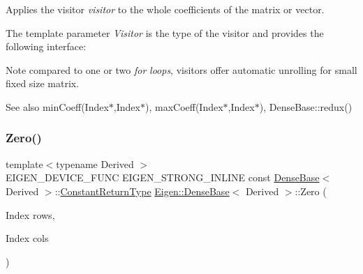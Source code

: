 Applies the visitor {\itshape visitor} to the whole coefficients of the matrix or vector.

The template parameter {\itshape Visitor} is the type of the visitor and provides the following interface\+: 
\begin{DoxyCode}{0}
\DoxyCodeLine{  \textcolor{comment}{// called for the first coefficient}}
\DoxyCodeLine{  \textcolor{comment}{// called for all other coefficients}}
\DoxyCodeLine{\};}
\end{DoxyCode}


\begin{DoxyNote}{Note}
compared to one or two {\itshape for} {\itshape loops}, visitors offer automatic unrolling for small fixed size matrix.
\end{DoxyNote}
\begin{DoxySeeAlso}{See also}
min\+Coeff(\+Index$\ast$,\+Index$\ast$), max\+Coeff(\+Index$\ast$,\+Index$\ast$), Dense\+Base\+::redux() 
\end{DoxySeeAlso}
\mbox{\label{class_eigen_1_1_dense_base_a3832aa9b2ee9ebdb4458003c742c9027}} 
\subsubsection{\texorpdfstring{Zero()}{Zero()}\hspace{0.1cm}{\footnotesize\ttfamily [1/3]}}
{\footnotesize\ttfamily template$<$typename Derived $>$ \\
E\+I\+G\+E\+N\+\_\+\+D\+E\+V\+I\+C\+E\+\_\+\+F\+U\+NC E\+I\+G\+E\+N\+\_\+\+S\+T\+R\+O\+N\+G\+\_\+\+I\+N\+L\+I\+NE const \mbox{\hyperlink{class_eigen_1_1_dense_base}{Dense\+Base}}$<$ Derived $>$\+::\mbox{\hyperlink{class_eigen_1_1_cwise_nullary_op}{Constant\+Return\+Type}} \mbox{\hyperlink{class_eigen_1_1_dense_base}{Eigen\+::\+Dense\+Base}}$<$ Derived $>$\+::Zero (\begin{DoxyParamCaption}\item[{Index}]{rows,  }\item[{Index}]{cols }\end{DoxyParamCaption})\hspace{0.3cm}{\ttfamily [static]}}

